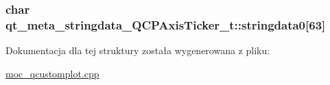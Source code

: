 \subsubsection[{\texorpdfstring{stringdata0}{stringdata0}}]{\setlength{\rightskip}{0pt plus 5cm}char qt\+\_\+meta\+\_\+stringdata\+\_\+\+Q\+C\+P\+Axis\+Ticker\+\_\+t\+::stringdata0\mbox{[}63\mbox{]}}\hypertarget{structqt__meta__stringdata___q_c_p_axis_ticker__t_a8600a85cebf0ead1c96536e854070e8b}{}\label{structqt__meta__stringdata___q_c_p_axis_ticker__t_a8600a85cebf0ead1c96536e854070e8b}


Dokumentacja dla tej struktury została wygenerowana z pliku\+:\begin{DoxyCompactItemize}
\item 
\hyperlink{moc__qcustomplot_8cpp}{moc\+\_\+qcustomplot.\+cpp}\end{DoxyCompactItemize}
